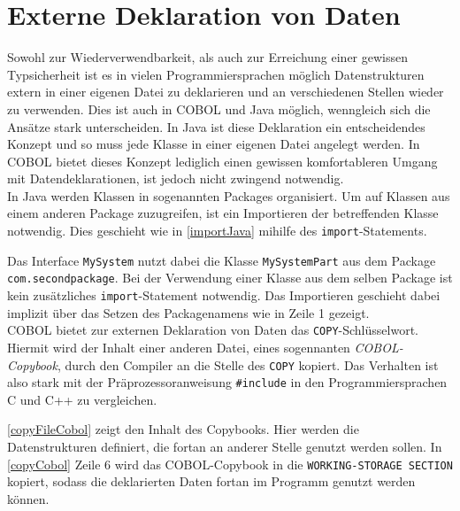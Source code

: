 \section{Externe Deklaration von Daten} 
  

Sowohl zur Wiederverwendbarkeit, als auch zur Erreichung einer gewissen Typsicherheit ist es in vielen Programmiersprachen möglich Datenstrukturen extern in einer eigenen Datei zu deklarieren und an verschiedenen Stellen wieder zu verwenden. Dies ist auch in COBOL und Java möglich, wenngleich sich die Ansätze stark unterscheiden. In Java ist diese Deklaration ein entscheidendes Konzept und so muss jede Klasse in einer eigenen Datei angelegt werden. In COBOL bietet dieses Konzept lediglich einen gewissen komfortableren Umgang mit Datendeklarationen, ist jedoch nicht zwingend notwendig.\\

In Java werden Klassen in sogenannten Packages organisiert. Um auf Klassen aus einem anderen Package zuzugreifen, ist ein Importieren der betreffenden Klasse notwendig. Dies geschieht wie in \autoref{importJava} mihilfe des \texttt{import}-Statements.\\


Das Interface \texttt{MySystem} nutzt dabei die Klasse \texttt{MySystemPart} aus dem Package \texttt{com.secondpackage}. Bei der Verwendung einer Klasse aus dem selben Package ist kein zusätzliches \texttt{import}-Statement notwendig. Das Importieren geschieht dabei implizit über das Setzen des Packagenamens wie in Zeile 1 gezeigt.\\

COBOL bietet zur externen Deklaration von Daten das \texttt{COPY}-Schlüsselwort. Hiermit wird der Inhalt einer anderen Datei, eines sogennanten \textit{COBOL-Copybook}, durch den Compiler an die Stelle des \texttt{COPY} kopiert. Das Verhalten ist also stark mit der Präprozessoranweisung \texttt{#include} in den Programmiersprachen C und C++ zu vergleichen.\\



\autoref{copyFileCobol} zeigt den Inhalt des Copybooks. Hier werden die Datenstrukturen definiert, die fortan an anderer Stelle genutzt werden sollen. In \autoref{copyCobol} Zeile 6 wird das COBOL-Copybook in die \texttt{WORKING-STORAGE SECTION} kopiert, sodass die deklarierten Daten fortan im Programm genutzt werden können.\\

